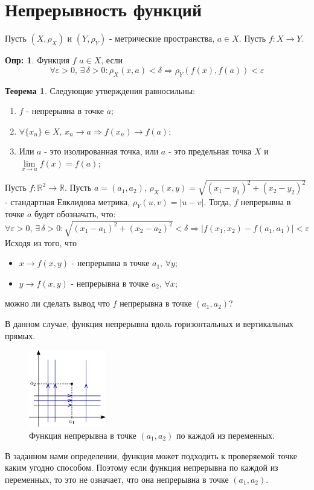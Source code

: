 \documentclass[12pt]{article}
\newcommand{\RN}[1]{%
	\textup{\uppercase\expandafter{\romannumeral#1}}%
}
\newcommand{\MR}{\mathbb{R}}
\newcommand{\VE}{\varepsilon}
\theoremstyle{definition}
\newtheorem{defn}{Опр:}
\newtheorem{theorem}{Теорема}
\begin{document}
\lhead{Математический анализ - \RN{2}}
\section*{Непрерывность функций}
Пусть $(X,\rho_X)$ и $(Y,\rho_Y)$ - метрические пространства, $a \in X$. Пусть $f\colon X \to Y$.
\begin{defn}
	Функция $f$  $a \in X$, если
	$$
	\forall \VE > 0, \, \exists \, \delta > 0 \colon \rho_X(x,a) < \delta \Rightarrow \rho_Y(f(x),f(a)) < \VE
	$$
\end{defn}

\begin{theorem}
	Следующие утверждения равносильны:
	\begin{enumerate}[label ={(\arabic*)}]
		\item $f$ - непрерывна в точке $a$;
		\item $\forall \{x_n\} \in X,\,  x_n \to a \Rightarrow f(x_n) \to f(a)$;
		\item Или $a$ - это изолированная точка, или $a$ - это предельная точка $X$ и $\lim\limits_{x \to a} f(x) = f(a)$;
	\end{enumerate}
\end{theorem}

Пусть $f \colon \MR^2 \to \MR$. Пусть $a = (a_1,a_2)$, $\rho_X(x,y) = \sqrt{(x_1 - y_1)^2 + (x_2 - y_2)^2}$ - стандартная Евклидова метрика, $\rho_Y(u,v) = |u - v|$. Тогда, $f$ непрерывна в точке $a$ будет обозначать, что:
$$
	\forall \VE > 0, \, \exists \, \delta > 0 \colon \sqrt{(x_1 - a_1)^2 + (x_2 - a_2)^2} < \delta \Rightarrow |f(x_1,x_2) - f(a_1,a_1) | < \VE
$$
Исходя из того, что
\begin{itemize}
	\item $x \to f(x,y)$ - непрерывна в точке $a_1, \, \forall y$;
	\item $y \to f(x,y)$ - непрерывна в точке $a_2, \, \forall x$;
\end{itemize}
можно ли сделать вывод что $f$ непрерывна в точке $(a_1,a_2)$?

В данном случае, функция непрерывна вдоль горизонтальных и вертикальных прямых.
\begin{figure}[H]
	\centering
	\includegraphics[width=0.3\textwidth]{10_1.eps}
	\caption{Функция непрерывна в точке $(a_1,a_2)$ по каждой из переменных.}
	\label{10_1}
\end{figure}
В заданном нами определении, функция может подходить к проверяемой точке каким угодно способом. Поэтому если функция непрерывна по каждой из переменных, то это не означает, что она непрерывна в точке $(a_1,a_2)$.
\end{document}
